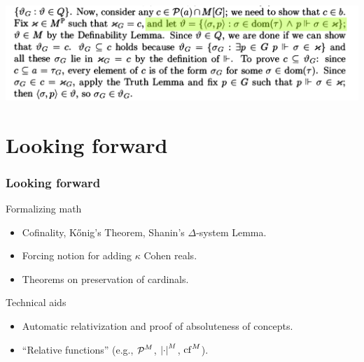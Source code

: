 \documentclass[english]{beamer}
\begin{document}
\begin{frame}
  \begin{center}\setlength{\fboxsep}{0pt}
    \vspace{3.00115pt}\includegraphics[scale=0.23]{kunen_powerset_10.png} \\ %
  \end{center}
\end{frame}


\section{Looking forward}

\begin{frame}
  \frametitle{Looking forward}
  \begin{block}{Formalizing math}
    \begin{itemize}
    \item Cofinality, K\H{o}nig's Theorem, Shanin's $\Delta$-system Lemma.
    \item Forcing notion for adding $\kappa$ Cohen reals.
    \item Theorems on preservation of cardinals.
    \end{itemize}
  \end{block}
  \pause
  \begin{block}{Technical aids}
    \begin{itemize}
    \item Automatic relativization and proof of absoluteness of concepts.
    \item ``Relative functions'' (e.g., $\P^M$, $\card{\cdot}^M$, $\cf^M$).
    \end{itemize}
  \end{block}
\end{frame}
\end{document}
